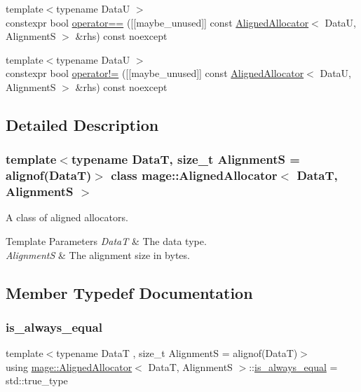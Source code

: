 \begin{DoxyCompactItemize}
\item 
{\footnotesize template$<$typename DataU $>$ }\\constexpr bool \hyperlink{classmage_1_1_aligned_allocator_a4f3c027b1f57bce8d2160b65eee8e49c}{operator==} (\mbox{[}\mbox{[}maybe\+\_\+unused\mbox{]}\mbox{]} const \hyperlink{classmage_1_1_aligned_allocator}{Aligned\+Allocator}$<$ DataU, AlignmentS $>$ \&rhs) const noexcept
\item 
{\footnotesize template$<$typename DataU $>$ }\\constexpr bool \hyperlink{classmage_1_1_aligned_allocator_a8b5b06229a4fec7804e1b0f979ba21d5}{operator!=} (\mbox{[}\mbox{[}maybe\+\_\+unused\mbox{]}\mbox{]} const \hyperlink{classmage_1_1_aligned_allocator}{Aligned\+Allocator}$<$ DataU, AlignmentS $>$ \&rhs) const noexcept
\end{DoxyCompactItemize}


\subsection{Detailed Description}
\subsubsection*{template$<$typename DataT, size\+\_\+t AlignmentS = alignof(\+Data\+T)$>$\newline
class mage\+::\+Aligned\+Allocator$<$ Data\+T, Alignment\+S $>$}

A class of aligned allocators.


\begin{DoxyTemplParams}{Template Parameters}
{\em DataT} & The data type. \\
\hline
{\em AlignmentS} & The alignment size in bytes. \\
\hline
\end{DoxyTemplParams}


\subsection{Member Typedef Documentation}
\hypertarget{classmage_1_1_aligned_allocator_a7733565bae4efdc332035461bc307df8}{}\label{classmage_1_1_aligned_allocator_a7733565bae4efdc332035461bc307df8} 
\subsubsection{\texorpdfstring{is\+\_\+always\+\_\+equal}{is\_always\_equal}}
{\footnotesize\ttfamily template$<$typename DataT , size\+\_\+t AlignmentS = alignof(\+Data\+T)$>$ \\
using \hyperlink{classmage_1_1_aligned_allocator}{mage\+::\+Aligned\+Allocator}$<$ DataT, AlignmentS $>$\+::\hyperlink{classmage_1_1_aligned_allocator_a7733565bae4efdc332035461bc307df8}{is\+\_\+always\+\_\+equal} =  std\+::true\+\_\+type}

